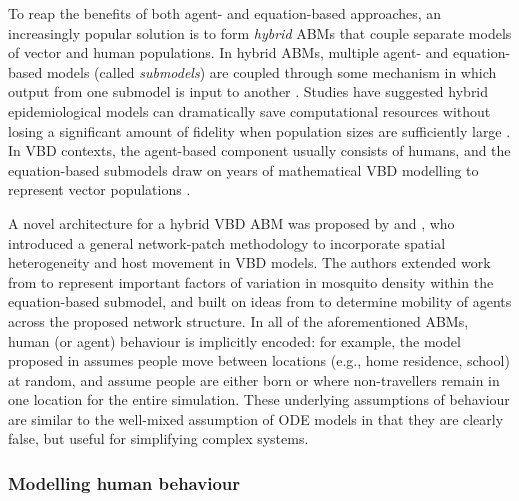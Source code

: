 To reap the benefits of both agent- and equation-based approaches, an increasingly popular solution is to form \textit{hybrid} ABMs that couple separate models of vector and human populations. In hybrid ABMs, multiple agent- and equation-based models (called \textit{submodels}) are coupled through some mechanism in which output from one submodel is input to another \cite{borshchev_system_2004}. Studies have suggested hybrid epidemiological models can dramatically save computational resources without losing a significant amount of fidelity when population sizes are sufficiently large \cite{bobashev_hybrid_2007, hunter_comparison_2018, hunter_hybrid_2020}. In VBD contexts, the agent-based component usually consists of humans, and the equation-based submodels draw on years of mathematical VBD modelling to represent vector populations \cite{mniszewski_towards_2014, manore_network-patch_2015, mateus_c_modeling_2021}.

A novel architecture for a hybrid VBD ABM was proposed by \citet{manore_network-patch_2015} and \citet{mniszewski_towards_2014}, who introduced a general network-patch methodology to incorporate spatial heterogeneity and host movement in VBD models. The authors extended work from \citet{adams_man_2009} to represent important factors of variation in mosquito density within the equation-based submodel, and built on ideas from \citet{perkins_heterogeneity_2013} to determine mobility of agents across the proposed network structure. In all of the aforementioned ABMs, human (or agent) behaviour is implicitly encoded: for example, the model proposed in \citet{manore_network-patch_2015} assumes people move between locations (e.g., home residence, school) at random, and \citet{dommar_agent-based_2014} assume people are either born  or  where non-travellers remain in one location for the entire simulation. These underlying assumptions of behaviour are similar to the well-mixed assumption of ODE models in that they are clearly false, but useful for simplifying complex systems.

\subsubsection{Modelling human behaviour}

